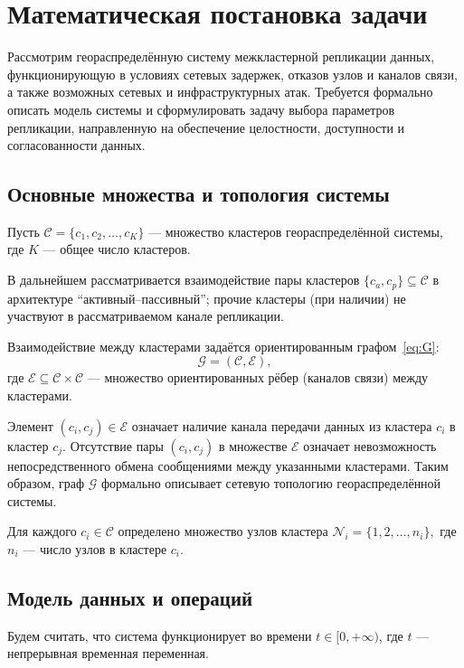 \section{Математическая постановка задачи}

Рассмотрим геораспределённую систему межкластерной репликации данных,
функционирующую в условиях сетевых задержек, отказов узлов и каналов связи,
а также возможных сетевых и инфраструктурных атак. Требуется формально
описать модель системы и сформулировать задачу выбора параметров репликации,
направленную на обеспечение целостности, доступности и согласованности данных.

\subsection{Основные множества и топология системы}

Пусть
$\mathcal{C} = \{c_1, c_2,\dots, c_K\}$
--- множество кластеров геораспределённой системы, где $K$ --- общее число кластеров.

В дальнейшем рассматривается взаимодействие пары кластеров
$\{c_a,c_p\}\subseteq\mathcal{C}$ в архитектуре ``активный--пассивный'';
прочие кластеры (при наличии) не участвуют в рассматриваемом канале репликации.

Взаимодействие между кластерами задаётся ориентированным графом~\ref{eq:G}:
\begin{equation}
\mathcal{G} = (\mathcal{C}, \mathcal{E}),
\label{eq:G}
\end{equation}
где $\mathcal{E} \subseteq \mathcal{C} \times \mathcal{C}$ ---
множество ориентированных рёбер (каналов связи) между кластерами.

Элемент
$(c_i, c_j) \in \mathcal{E}$
означает наличие канала передачи данных из кластера $c_i$ в кластер $c_j$.
Отсутствие пары $(c_i,c_j)$ в множестве $\mathcal{E}$ означает невозможность
непосредственного обмена сообщениями между указанными кластерами.
Таким образом, граф $\mathcal{G}$ формально описывает сетевую топологию
геораспределённой системы.

Для каждого $c_i \in \mathcal{C}$ определено множество узлов кластера
$
\mathcal{N}_i = \{1,2,\dots,n_i\},
$
где $n_i$ --- число узлов в кластере $c_i$.

\subsection{Модель данных и операций}

Будем считать, что система функционирует во времени
$t \in [0,+\infty)$,
где $t$ --- непрерывная временная переменная.


